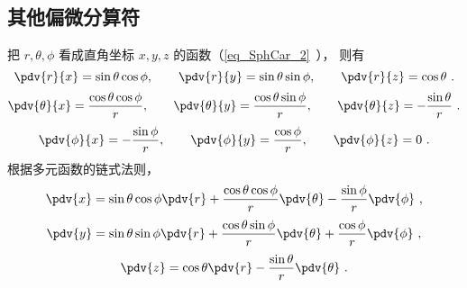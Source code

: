 \subsection{其他偏微分算符}
把 $r,\theta,\phi$ 看成直角坐标 $x,y,z$ 的函数（\autoref{eq_SphCar_2}~）， 则有
\begin{equation}
\pdv{r}{x} = \sin\theta\cos\phi, \qquad
\pdv{r}{y} = \sin\theta\sin\phi, \qquad
\pdv{r}{z} = \cos\theta~.
\end{equation}
\begin{equation}
\pdv{\theta}{x} = \frac{\cos\theta\cos\phi}{r}, \qquad
\pdv{\theta}{y} = \frac{\cos\theta\sin\phi}{r}, \qquad
\pdv{\theta}{z} = -\frac{\sin\theta}{r}~.
\end{equation}
\begin{equation}
\pdv{\phi}{x} = -\frac{\sin\phi}{r}, \qquad
\pdv{\phi}{y} = \frac{\cos\phi}{r}, \qquad
\pdv{\phi}{z} = 0~.
\end{equation}
根据多元函数的链式法则，
\begin{equation}\label{eq_SphNab_6}
\pdv{x} = \sin\theta\cos\phi\pdv{r} + \frac{\cos\theta\cos\phi}{r}\pdv{\theta} -\frac{\sin\phi}{r}\pdv{\phi}~,
\end{equation}
\begin{equation}\label{eq_SphNab_7}
\pdv{y} = \sin\theta\sin\phi\pdv{r} + \frac{\cos\theta\sin\phi}{r}\pdv{\theta} +\frac{\cos\phi}{r}\pdv{\phi}~,
\end{equation}
\begin{equation}\label{eq_SphNab_5}
\pdv{z} = \cos\theta\pdv{r} - \frac{\sin\theta}{r}\pdv{\theta}~.
\end{equation}
